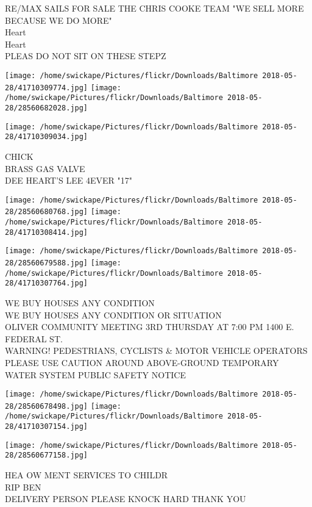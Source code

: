\documentclass[10pt,letterpaper]{article}
\begin{document}
RE/MAX SAILS FOR SALE THE CHRIS COOKE TEAM "WE SELL MORE BECAUSE WE DO MORE"\\
Heart\\
Heart\\
PLEAS DO NOT SIT ON THESE STEPZ\\
\pagebreak

\texttt{[image: /home/swickape/Pictures/flickr/Downloads/Baltimore 2018-05-28/41710309774.jpg]}
\texttt{[image: /home/swickape/Pictures/flickr/Downloads/Baltimore 2018-05-28/28560682028.jpg]}

\vspace{0.25in}
\texttt{[image: /home/swickape/Pictures/flickr/Downloads/Baltimore 2018-05-28/41710309034.jpg]}

CHICK\\
BRASS GAS VALVE\\
DEE HEART'S LEE 4EVER "17"\\
\pagebreak

\texttt{[image: /home/swickape/Pictures/flickr/Downloads/Baltimore 2018-05-28/28560680768.jpg]}
\texttt{[image: /home/swickape/Pictures/flickr/Downloads/Baltimore 2018-05-28/41710308414.jpg]}

\texttt{[image: /home/swickape/Pictures/flickr/Downloads/Baltimore 2018-05-28/28560679588.jpg]}
\texttt{[image: /home/swickape/Pictures/flickr/Downloads/Baltimore 2018-05-28/41710307764.jpg]}

WE BUY HOUSES ANY CONDITION\\
WE BUY HOUSES ANY CONDITION OR SITUATION\\
OLIVER COMMUNITY MEETING 3RD THURSDAY AT 7:00 PM 1400 E. FEDERAL ST.\\
WARNING!  PEDESTRIANS, CYCLISTS \& MOTOR VEHICLE OPERATORS PLEASE USE CAUTION AROUND ABOVE{-}GROUND TEMPORARY WATER SYSTEM PUBLIC SAFETY NOTICE\\
\pagebreak

\texttt{[image: /home/swickape/Pictures/flickr/Downloads/Baltimore 2018-05-28/28560678498.jpg]}
\texttt{[image: /home/swickape/Pictures/flickr/Downloads/Baltimore 2018-05-28/41710307154.jpg]}

\texttt{[image: /home/swickape/Pictures/flickr/Downloads/Baltimore 2018-05-28/28560677158.jpg]}

HEA OW MENT SERVICES TO CHILDR\\
RIP BEN\\
DELIVERY PERSON PLEASE KNOCK HARD THANK YOU\\
\pagebreak
\end{document}
